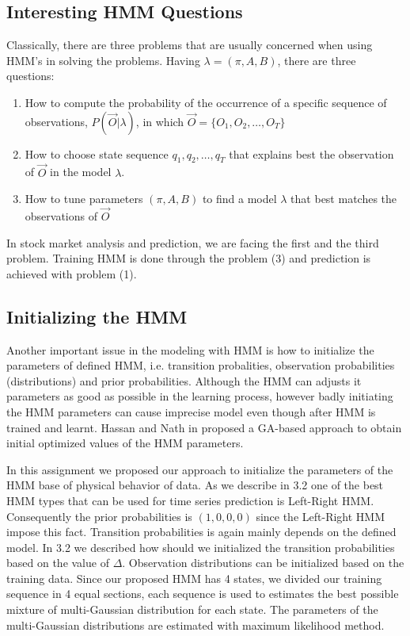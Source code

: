 \documentclass{acm_proc_article-sp}
\begin{document}
\subsection{Interesting HMM Questions} \label{sec:hmm_probs}
Classically, there are three problems that are usually concerned when using HMM's in solving the problems. Having
$\lambda = (\pi, A, B)$, there are three questions:
\begin{enumerate}
  \item How to compute the probability of the occurrence of a specific sequence of observations, $P(\vec{O}|\lambda)$,
  in which $\vec{O} = \{O_1, O_2, \ldots, O_T\}$
  \item How to choose state sequence $q_1, q_2, \ldots, q_T$ that explains best the observation of $\vec{O}$ in the
  model $\lambda$.
  \item How to tune parameters $(\pi, A, B)$ to find a model $\lambda$ that best matches the observations of $\vec{O}$
\end{enumerate}

In stock market analysis and prediction, we are facing the first and the third problem. Training HMM is done through
the problem (3) and prediction is achieved with problem (1).

\subsection{Initializing the HMM} \label{sec:ini_hmm}
Another important issue in the modeling with HMM is how to initialize the parameters of defined HMM, i.e. transition probalities, observation probabilities (distributions) and prior probabilities. Although the HMM can adjusts it parameters as good as possible in the learning process, however badly initiating the HMM parameters can cause imprecise model even though after HMM is trained and learnt. Hassan and Nath in \cite{hassan:hmm_GA} proposed a GA-based approach to obtain initial optimized values of the HMM parameters.

In this assignment we proposed our approach to initialize the parameters of the HMM base of physical behavior of data. As we describe in 3.2 one of the best HMM types that can be used for time series prediction is Left-Right HMM. Consequently the prior probabilities is $(1,0,0,0)$ since the Left-Right HMM impose this fact. Transition probabilities is again mainly depends on the defined model. In 3.2 we described how should we initialized the transition probabilities based on the value of $\Delta$.
 Observation distributions can be initialized based on the training data. Since our proposed HMM has 4 states, we divided our training sequence in 4 equal sections, each sequence is used to estimates the best possible mixture of multi-Gaussian distribution for each state. The parameters of the multi-Gaussian distributions are estimated with maximum likelihood method.
\end{document}
